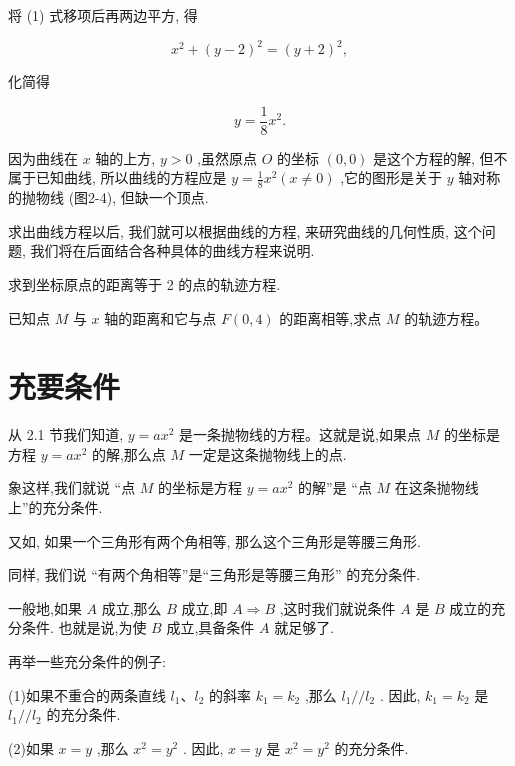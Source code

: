 \documentclass[lang=cn,newtx,10pt,scheme=chinese]{elegantbook}
\begin{document}
将 (1) 式移项后再两边平方, 得

\[
    {x}^{2} + {\left( y - 2\right) }^{2} = {\left( y + 2\right) }^{2},
\]

化简得

\[
  y = \frac{1}{8}{x}^{2}.
\]

因为曲线在 \(x\) 轴的上方, \(y > 0\) ,虽然原点 \(O\) 的坐标 \(\left( {0,0}\right)\) 是这个方程的解, 但不属于已知曲线, 所以曲线的方程应是 \(y = \frac{1}{8}{x}^{2}\left( {x \neq 0}\right)\) ,它的图形是关于 \(y\) 轴对称的抛物线 (图2-4), 但缺一个顶点.

求出曲线方程以后, 我们就可以根据曲线的方程, 来研究曲线的几何性质, 这个问题, 我们将在后面结合各种具体的曲线方程来说明.

\begin{problemset}[练习]

\item 求到坐标原点的距离等于 2 的点的轨迹方程.

\item 已知点 \(M\) 与 \(x\) 轴的距离和它与点 \(F\left( {0,4}\right)\) 的距离相等,求点 \(M\) 的轨迹方程。

\end{problemset}

\section{充要条件}

从 2.1 节我们知道, \(y = a{x}^{2}\) 是一条抛物线的方程。这就是说,如果点 \(M\) 的坐标是方程 \(y = a{x}^{2}\) 的解,那么点 \(M\) 一定是这条抛物线上的点.

象这样,我们就说 “点 \(M\) 的坐标是方程 \(y = a{x}^{2}\) 的解”是 “点 \(M\) 在这条抛物线上”的充分条件.

又如, 如果一个三角形有两个角相等, 那么这个三角形是等腰三角形.

同样, 我们说 “有两个角相等”是“三角形是等腰三角形” 的充分条件.
\begin{definition}[充分条件]
一般地,如果 \(A\) 成立,那么 \(B\) 成立,即 \(A \Rightarrow B\) ,这时我们就说条件 \(A\) 是 \(B\) 成立的充分条件. 也就是说,为使 \(B\) 成立,具备条件 \(A\) 就足够了.
\end{definition}
再举一些充分条件的例子:

(1)如果不重合的两条直线 \({l}_{1}\text{、}{l}_{2}\) 的斜率 \({k}_{1} = {k}_{2}\) ,那么 \({l}_{1}//{l}_{2}\) . 因此, \({k}_{1} = {k}_{2}\) 是 \({l}_{1}//{l}_{2}\) 的充分条件.

(2)如果 \(x = y\) ,那么 \({x}^{2} = {y}^{2}\) . 因此, \(x = y\) 是 \({x}^{2} = {y}^{2}\) 的充分条件.
\end{document}
